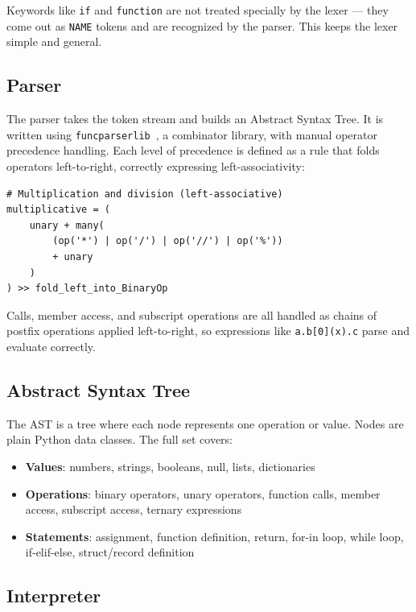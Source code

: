 \documentclass[conference]{IEEEtran}
\begin{document}
Keywords like \texttt{if} and \texttt{function} are not treated specially by the lexer — they come out as \texttt{NAME} tokens and are recognized by the parser. This keeps the lexer simple and general.

\subsection{Parser}

The parser takes the token stream and builds an Abstract Syntax Tree. It is written using \texttt{funcparserlib}~\cite{funcparserlib}, a combinator library, with manual operator precedence handling. Each level of precedence is defined as a rule that folds operators left-to-right, correctly expressing left-associativity:

\begin{lstlisting}
# Multiplication and division (left-associative)
multiplicative = (
    unary + many(
        (op('*') | op('/') | op('//') | op('%'))
        + unary
    )
) >> fold_left_into_BinaryOp
\end{lstlisting}

Calls, member access, and subscript operations are all handled as chains of postfix operations applied left-to-right, so expressions like \texttt{a.b[0](x).c} parse and evaluate correctly.

\subsection{Abstract Syntax Tree}

The AST is a tree where each node represents one operation or value. Nodes are plain Python data classes. The full set covers:

\begin{itemize}
    \item \textbf{Values}: numbers, strings, booleans, null, lists, dictionaries
    \item \textbf{Operations}: binary operators, unary operators, function calls, member access, subscript access, ternary expressions
    \item \textbf{Statements}: assignment, function definition, return, for-in loop, while loop, if-elif-else, struct/record definition
\end{itemize}

\subsection{Interpreter}
\end{document}
